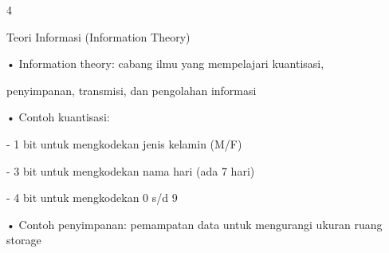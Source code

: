 \documentclass{article}
\begin{document}

4

Teori Informasi (Information Theory)

• Information theory: cabang ilmu yang mempelajari kuantisasi, 

penyimpanan, transmisi, dan pengolahan informasi

• Contoh kuantisasi: 

 - 1 bit untuk mengkodekan jenis kelamin (M/F)

 - 3 bit untuk mengkodekan nama hari  (ada 7 hari)

 - 4 bit untuk mengkodekan  0 s/d 9 

• Contoh penyimpanan: pemampatan data untuk mengurangi ukuran ruang storage
\end{document}

